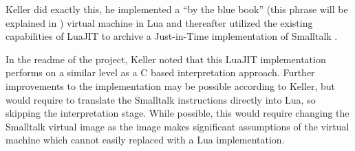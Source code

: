 Keller did exactly this, he implemented a \enquote{by the blue book} (this phrase will be explained in ) virtual machine in Lua and thereafter utilized the existing capabilities of LuaJIT to archive a Just-in-Time implementation of Smalltalk \cite{Keller2021}.

In the readme of the project, Keller noted that this LuaJIT implementation performs on a similar level as a C\+\+ based interpretation approach. 
Further improvements to the implementation may be possible according to Keller, but would require to translate the Smalltalk instructions directly into Lua, so skipping the interpretation stage. While possible, this would require changing the Smalltalk virtual image as the image makes significant assumptions of the virtual machine which cannot easily replaced with a Lua implementation.
